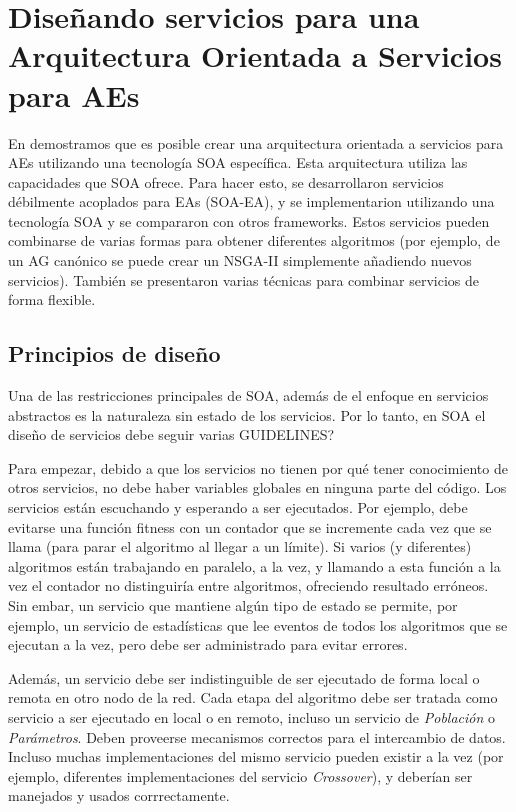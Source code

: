 \documentclass[runningheads]{llncs}
\begin{document}
\section{Diseñando servicios para una Arquitectura Orientada a Servicios para AEs}
\label{sec:design}

En \cite{OSGILIATH} demostramos que es posible crear una arquitectura orientada a servicios para AEs utilizando una tecnología SOA específica. Esta arquitectura utiliza las capacidades que SOA ofrece. Para hacer esto, se desarrollaron servicios débilmente acoplados para EAs (SOA-EA), y se implementarion utilizando una tecnología SOA y se compararon con otros frameworks. Estos servicios pueden combinarse de varias formas para obtener diferentes algoritmos (por ejemplo, de un AG canónico se puede crear un NSGA-II simplemente añadiendo nuevos servicios). También se presentaron varias técnicas para combinar servicios de forma flexible.


\subsection{Principios de diseño}

Una de las restricciones principales de SOA, además de el enfoque en servicios abstractos es la naturaleza sin estado de los servicios. Por lo tanto, en SOA el diseño de servicios debe seguir varias GUIDELINES?

Para empezar, debido a que los servicios no tienen por qué tener conocimiento de otros servicios, no debe haber variables globales en ninguna parte del código. Los servicios están escuchando y esperando a ser ejecutados. Por ejemplo, debe evitarse una función fitness con un contador que se incremente cada vez que se llama (para parar el algoritmo al llegar a un límite). Si varios (y diferentes) algoritmos están trabajando en paralelo, a la vez, y llamando a esta función a la vez el contador no distinguiría entre algoritmos, ofreciendo resultado erróneos. Sin embar, un servicio que mantiene algún tipo de estado se permite, por ejemplo, un servicio de estadísticas que lee eventos de todos los algoritmos que se ejecutan a la vez, pero debe ser administrado para evitar errores.

Además, un servicio debe ser indistinguible de ser ejecutado de forma local o remota en otro nodo de la red. Cada etapa del algoritmo debe ser tratada como servicio a ser ejecutado en local o en remoto, incluso un servicio de {\em Población} o {\em Parámetros}. Deben proveerse mecanismos correctos para el intercambio de datos. Incluso muchas implementaciones del mismo servicio pueden existir a la vez (por ejemplo, diferentes implementaciones del servicio {\em Crossover}), y deberían ser manejados y usados corrrectamente.
\end{document}
